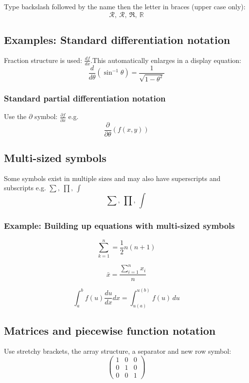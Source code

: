 \documentclass[a4paper,12pt]{extarticle}
\begin{document}
Type backslash followed by the name then the letter in braces (upper case only):
\[
\mathcal{R},\ \mathscr{R},\ \mathfrak{R},\ \mathbb{R}
\]

\subsection{Examples: Standard differentiation notation}

Fraction structure is used: \(\frac{df}{dx}\).This automatically enlarges in a display equation:
\[
\frac{d}{d\theta}(\sin^{-1}\theta)=\frac{1}{\sqrt{1-\theta^2}}
\]

\subsubsection{Standard partial differentiation notation}

Use the \(\partial\) symbol: \(\frac{\partial f}{\partial x}\) e.g.
\[\frac{\partial}{\partial\theta}(f(x,y))\]

\subsection{Multi-sized symbols}

Some symbols exist in multiple sizes and may also have superscripts and subscripts e.g. \(\sum, \ \prod, \ \int\)
\[
\sum, \ \prod, \ \int
\]

\subsubsection{Example: Building up equations with multi-sized symbols}

\[\sum_{k=1}^n = \frac{1}{2}n(n+1)\]

\[\bar{x} = \frac{\sum_{i=1}^n x_i}{n}\]

\[\int_a^b f(u)\frac{du}{dx}dx = \int_{u(a)}^{u(b)}f(u)\, du\]

\subsection{Matrices and piecewise function notation}

Use stretchy brackets, the array structure, a separator and new row symbol:
\[
\left(
\begin{array}{ccc}
1 & 0 & 0 \\
0 & 1 & 0 \\
0 & 0 & 1
\end{array}
\right)
\]
\end{document}
